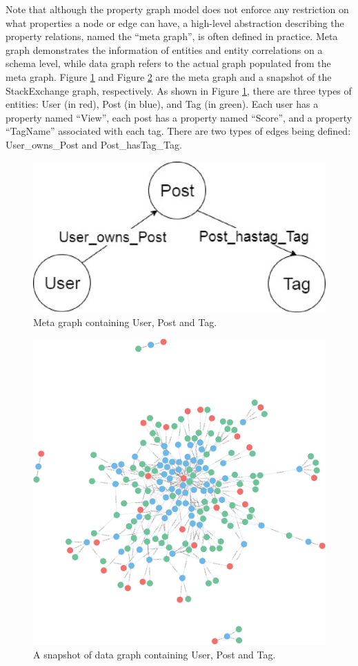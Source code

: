 Note that although the property graph model does not enforce any restriction on what properties a node or edge can have, a high-level abstraction describing the property relations, named the ``meta graph'', is often defined in practice. Meta graph demonstrates the information of entities and entity correlations on a schema level, while data graph refers to the actual graph populated from the meta graph. Figure \ref{fig:2} and Figure \ref{fig:3} are the meta graph and a snapshot of the StackExchange graph, respectively. As shown in Figure \ref{fig:2}, there are three types of entities: User (in red), Post (in blue), and Tag (in green). Each user has a property named ``View'', each post has a property named ``Score'', and a property ``TagName'' associated with each tag. There are two types of edges being  defined: User\_owns\_Post and Post\_hasTag\_Tag.


\begin{figure}
	\centering
	\includegraphics[scale=0.5]{pic/12.eps}
	\caption{Meta graph containing User, Post and Tag.}
	\label{fig:2}
\end{figure}

\begin{figure}
	\centering
	\includegraphics[scale=0.1]{pic/3.eps}
	\caption{A snapshot of data graph containing User, Post and Tag.}
	\label{fig:3}
\end{figure}

